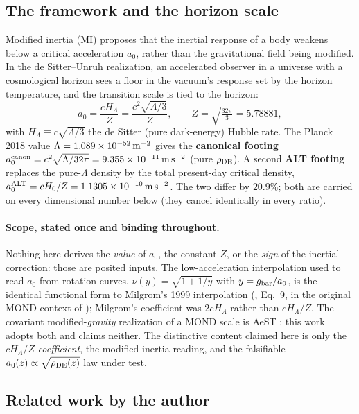 \documentclass[11pt,a4paper]{article}
\newcommand{\rhoDE}{\rho_{\rm DE}}
\newcommand{\azero}{a_0}
\newcommand{\msms}{{\rm m\,s^{-2}}}
\begin{document}
\subsection{The framework and the horizon scale}
\label{sec:framework}

Modified inertia (MI) proposes that the inertial response of a body weakens
below a critical acceleration $\azero$, rather than the gravitational field
being modified. In the de Sitter--Unruh realization, an accelerated observer
in a universe with a cosmological horizon sees a floor in the vacuum's
response set by the horizon temperature, and the transition scale is tied to
the horizon:
\begin{equation}
\azero=\frac{cH_\Lambda}{Z}=\frac{c^2\sqrt{\Lambda/3}}{Z},
\qquad Z=\sqrt{\tfrac{32\pi}{3}}=5.78881,
\label{eq:a0}
\end{equation}
with $H_\Lambda\equiv c\sqrt{\Lambda/3}$ the de Sitter (pure dark-energy)
Hubble rate. The Planck 2018 value $\Lambda=1.089\times10^{-52}\,{\rm m^{-2}}$
gives the \textbf{canonical footing}
$\azero^{\rm canon}=c^2\sqrt{\Lambda/32\pi}=9.355\times10^{-11}\,\msms$ (pure
$\rhoDE$). A second \textbf{ALT footing} replaces the pure-$\Lambda$ density
by the total present-day critical density,
$\azero^{\rm ALT}=cH_0/Z=1.1305\times10^{-10}\,\msms$. The two differ by
$20.9\%$; both are carried on every dimensional number below (they cancel
identically in every ratio).

\paragraph{Scope, stated once and binding throughout.} Nothing here derives
the \emph{value} of $\azero$, the constant $Z$, or the \emph{sign} of the
inertial correction: those are posited inputs. The low-acceleration
interpolation used to read $\azero$ from rotation curves,
$\nu(y)=\sqrt{1+1/y}$ with $y=g_{\rm bar}/\azero$, is the identical functional
form to Milgrom's 1999 interpolation (\cite{Milgrom1999}, Eq.~9, in the
original MOND context of \cite{Milgrom1983}); Milgrom's coefficient was
$2cH_\Lambda$ rather than $cH_\Lambda/Z$. The covariant modified-\emph{gravity}
realization of a MOND scale is AeST \cite{AeST}; this work adopts both and
claims neither. The distinctive content claimed here is only the
$cH_\Lambda/Z$ \emph{coefficient}, the modified-inertia reading, and the
falsifiable $\azero(z)\propto\sqrt{\rhoDE(z)}$ law under test.

\subsection{Related work by the author}
\label{sec:related}
\end{document}
